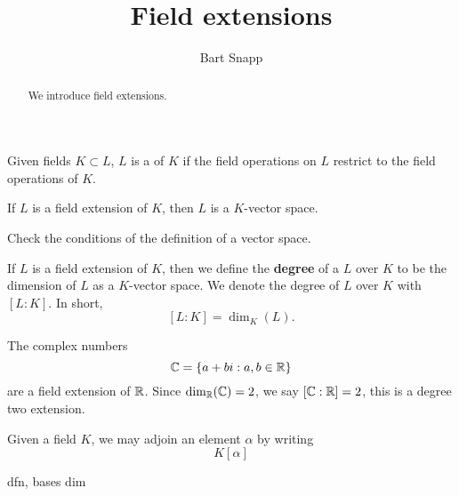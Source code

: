 \documentclass{ximera}
\author{Bart Snapp}
\title{Field extensions}
\begin{document}
\begin{abstract}
  We introduce field extensions.
\end{abstract}
\maketitle

\begin{definition}
  Given fields $K\subset L$, $L$ is a  of $K$ if
  the field operations on $L$ restrict to the field operations of $K$.
\end{definition}

\begin{lemma}
  If $L$ is a field extension of $K$, then $L$ is a $K$-vector space.
  \begin{sketch}
    Check the conditions of the definition of a vector space.
  \end{sketch}
\end{lemma}

\begin{definition}
  If $L$ is a field extension of $K$, then we define the
  \textbf{degree} of a $L$ over $K$ to be the dimension of $L$ as a
  $K$-vector space. We denote the degree of $L$ over $K$ with
  $[L:K]$. In short,
  \[
  [L:K] = \dim_K(L).
  \]
\end{definition}

\begin{example}
  The complex numbers
  \[
  \mathbb C = \{a+bi:a,b\in\mathbb R\}
  \]
  are a field extension of $\mathbb R$. Since $\dim_\mathbb R(\mathbb C)=2$, we say
  $[\mathbb C:\mathbb R]=2$, this is a degree two extension.
\end{example}


\begin{example}
  Given a field $K$, we may adjoin an element $\alpha$ by writing
  \[
  K[\alpha]
  \]
\end{example}



dfn, bases dim
\end{document}
